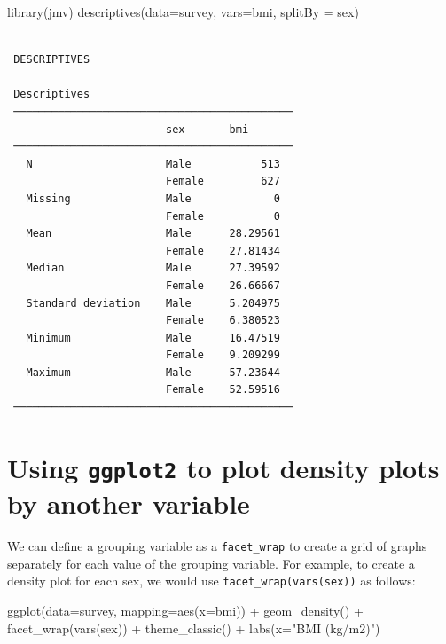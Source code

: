 \documentclass[
  a4paper,
]{memoir}
\newenvironment{Shaded}{\begin{snugshade}}{\end{snugshade}}
\newcommand{\AttributeTok}[1]{\textcolor[rgb]{0.00,0.00,0.00}{#1}}
\newcommand{\FunctionTok}[1]{\textcolor[rgb]{0.00,0.00,0.00}{#1}}
\newcommand{\NormalTok}[1]{\textcolor[rgb]{0.00,0.00,0.00}{#1}}
\newcommand{\SpecialCharTok}[1]{\textcolor[rgb]{0.00,0.00,0.00}{#1}}
\newcommand{\StringTok}[1]{\textcolor[rgb]{0.00,0.00,0.00}{#1}}
\begin{document}
\begin{Shaded}
\begin{Highlighting}[]
\FunctionTok{library}\NormalTok{(jmv)}
\FunctionTok{descriptives}\NormalTok{(}\AttributeTok{data=}\NormalTok{survey, }\AttributeTok{vars=}\NormalTok{bmi, }\AttributeTok{splitBy =}\NormalTok{ sex)}
\end{Highlighting}
\end{Shaded}

\begin{verbatim}

 DESCRIPTIVES

 Descriptives                                 
 ──────────────────────────────────────────── 
                         sex       bmi        
 ──────────────────────────────────────────── 
   N                     Male           513   
                         Female         627   
   Missing               Male             0   
                         Female           0   
   Mean                  Male      28.29561   
                         Female    27.81434   
   Median                Male      27.39592   
                         Female    26.66667   
   Standard deviation    Male      5.204975   
                         Female    6.380523   
   Minimum               Male      16.47519   
                         Female    9.209299   
   Maximum               Male      57.23644   
                         Female    52.59516   
 ──────────────────────────────────────────── 
\end{verbatim}

\section{\texorpdfstring{Using \texttt{ggplot2} to plot density plots by
another
variable}{Using ggplot2 to plot density plots by another variable}}\label{using-ggplot2-to-plot-density-plots-by-another-variable}

We can define a grouping variable as a \texttt{facet\_wrap} to create a
grid of graphs separately for each value of the grouping variable. For
example, to create a density plot for each sex, we would use
\texttt{facet\_wrap(vars(sex))} as follows:

\begin{Shaded}
\begin{Highlighting}[]
\FunctionTok{ggplot}\NormalTok{(}\AttributeTok{data=}\NormalTok{survey, }\AttributeTok{mapping=}\FunctionTok{aes}\NormalTok{(}\AttributeTok{x=}\NormalTok{bmi)) }\SpecialCharTok{+}
  \FunctionTok{geom\_density}\NormalTok{() }\SpecialCharTok{+}
  \FunctionTok{facet\_wrap}\NormalTok{(}\FunctionTok{vars}\NormalTok{(sex)) }\SpecialCharTok{+}
  \FunctionTok{theme\_classic}\NormalTok{() }\SpecialCharTok{+}
  \FunctionTok{labs}\NormalTok{(}\AttributeTok{x=}\StringTok{"BMI (kg/m2)"}\NormalTok{)}
\end{Highlighting}
\end{Shaded}
\end{document}
